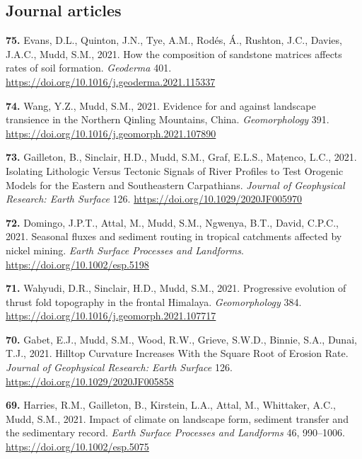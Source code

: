 \documentclass[10pt, a4paper]{article}
\newcommand{\years}[1]{\marginnote{\scriptsize #1}}
\begin{document}
\subsection*{Journal articles}



\years{2021}\hangindent=0.7cm\textbf{75. }Evans, D.L., Quinton, J.N., Tye, A.M., Rodés, Á., Rushton, J.C., Davies, J.A.C., Mudd, S.M., 2021. How the composition of sandstone matrices affects rates of soil formation. \textit{Geoderma} 401. \href{https://doi.org/10.1016/j.geoderma.2021.115337}{https://doi.org/10.1016/j.geoderma.2021.115337}\par
\years{2021}\hangindent=0.7cm\textbf{74. }Wang, Y.Z., Mudd, S.M., 2021. Evidence for and against landscape transience in the Northern Qinling Mountains, China. \textit{Geomorphology} 391. \href{https://doi.org/10.1016/j.geomorph.2021.107890}{https://doi.org/10.1016/j.geomorph.2021.107890}\par
\years{2021}\hangindent=0.7cm\textbf{73. }Gailleton, B., Sinclair, H.D., Mudd, S.M., Graf, E.L.S., Mațenco, L.C., 2021. Isolating Lithologic Versus Tectonic Signals of River Profiles to Test Orogenic Models for the Eastern and Southeastern Carpathians. \textit{Journal of Geophysical Research: Earth Surface} 126. \href{https://doi.org/10.1029/2020JF005970}{https://doi.org/10.1029/2020JF005970}\par
\years{2021}\hangindent=0.7cm\textbf{72. }Domingo, J.P.T., Attal, M., Mudd, S.M., Ngwenya, B.T., David, C.P.C., 2021. Seasonal fluxes and sediment routing in tropical catchments affected by nickel mining. \textit{Earth Surface Processes and Landforms}. \href{https://doi.org/10.1002/esp.5198}{https://doi.org/10.1002/esp.5198}\par
\years{2021}\hangindent=0.7cm\textbf{71. }Wahyudi, D.R., Sinclair, H.D., Mudd, S.M., 2021. Progressive evolution of thrust fold topography in the frontal Himalaya. \textit{Geomorphology} 384. \href{https://doi.org/10.1016/j.geomorph.2021.107717}{https://doi.org/10.1016/j.geomorph.2021.107717}\par
\years{2021}\hangindent=0.7cm\textbf{70. }Gabet, E.J., Mudd, S.M., Wood, R.W., Grieve, S.W.D., Binnie, S.A., Dunai, T.J., 2021. Hilltop Curvature Increases With the Square Root of Erosion Rate. \textit{Journal of Geophysical Research: Earth Surface} 126. \href{https://doi.org/10.1029/2020JF005858}{https://doi.org/10.1029/2020JF005858}\par
\years{2021}\hangindent=0.7cm\textbf{69. }Harries, R.M., Gailleton, B., Kirstein, L.A., Attal, M., Whittaker, A.C., Mudd, S.M., 2021. Impact of climate on landscape form, sediment transfer and the sedimentary record. \textit{Earth Surface Processes and Landforms} 46, 990–1006. \href{https://doi.org/10.1002/esp.5075}{https://doi.org/10.1002/esp.5075}\par
\end{document}
